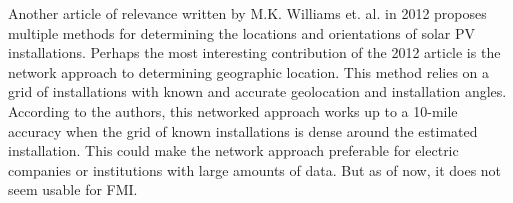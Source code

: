 


Another article of relevance written by M.K. Williams et. al. in 2012\cite{older_solar_solver_article} proposes multiple methods for determining the locations and orientations of solar PV installations. Perhaps the most interesting contribution of the 2012 article is the network approach to determining geographic location. This method relies on a grid of installations with known and accurate geolocation and installation angles. According to the authors, this networked approach works up to a 10-mile accuracy when the grid of known installations is dense around the estimated installation. This could make the network approach preferable for electric companies or institutions with large amounts of data. But as of now, it does not seem usable for FMI.


